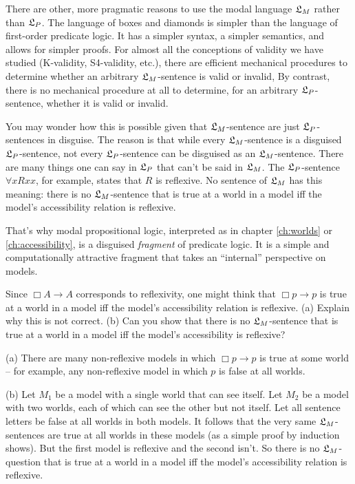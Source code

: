 There are other, more pragmatic reasons to use the modal language $\mathfrak{L}_M$ rather
than $\mathfrak{L}_P$. The language of boxes and diamonds is simpler than the language of
first-order predicate logic. It has a simpler syntax, a simpler semantics, and
allows for simpler proofs. For almost all the conceptions of validity we have
studied (K-validity, S4-validity, etc.), there are efficient mechanical
procedures to determine whether an arbitrary $\mathfrak{L}_M$-sentence is valid or
invalid, By contrast, there is no mechanical procedure at all to determine, for
an arbitrary $\mathfrak{L}_P$-sentence, whether it is valid or invalid.

You may wonder how this is possible given that $\mathfrak{L}_M$-sentence are just
$\mathfrak{L}_P$-sentences in disguise. The reason is that while every $\mathfrak{L}_M$-sentence is
a disguised $\mathfrak{L}_P$-sentence, not every $\mathfrak{L}_P$-sentence can be disguised as an
$\mathfrak{L}_M$-sentence. There are many things one can say in $\mathfrak{L}_P$ that can't be said
in $\mathfrak{L}_M$. The $\mathfrak{L}_{P}$-sentence $\forall x Rxx$, for example, states that $R$
is reflexive. No sentence of $\mathfrak{L}_M$ has this meaning: there is no
$\mathfrak{L}_{M}$-sentence that is true at a world in a model iff the model's
accessibility relation is reflexive.

That's why modal propositional logic, interpreted as in chapter \ref{ch:worlds}
or \ref{ch:accessibility}, is a disguised \emph{fragment} of predicate logic. It
is a simple and computationally attractive fragment that takes an ``internal''
perspective on models.

\begin{exercise}
  Since $\Box A \to A$ corresponds to reflexivity, one might think that
  $\Box p \to p$ is true at a world in a model iff the model's accessibility
  relation is reflexive. (a) Explain why this is not correct. (b) Can you 
  show that there is no $\mathfrak{L}_{M}$-sentence that is true at a world in a model iff
  the model's accessibility is reflexive?
\end{exercise}
\begin{solution}
  (a) There are many non-reflexive models in which $\Box p \to p$ is true at some
  world -- for example, any non-reflexive model in which $p$ is false at all
  worlds.

  (b) Let $M_1$ be a model with a single world that can see itself. Let $M_{2}$
  be a model with two worlds, each of which can see the other but not itself.
  Let all sentence letters be false at all worlds in both models. It follows
  that the very same $\mathfrak{L}_M$-sentences are true at all worlds in these models (as
  a simple proof by induction shows). But the first model is reflexive and the
  second isn't. So there is no $\mathfrak{L}_{M}$-question that is true at a world in a
  model iff the model's accessibility relation is reflexive.
\end{solution}

